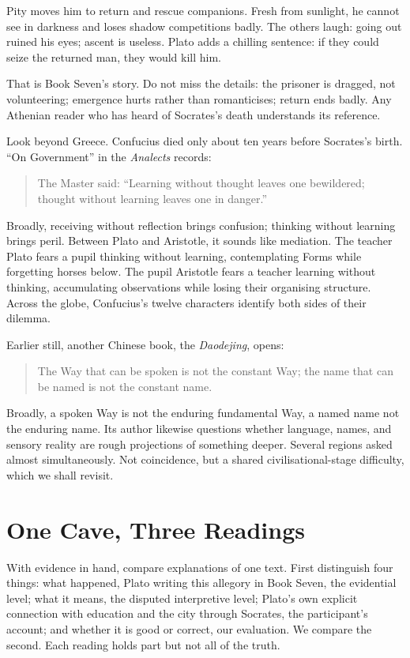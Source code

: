 Pity moves him to return and rescue companions. Fresh from sunlight, he cannot see in darkness and loses shadow competitions badly. The others laugh: going out ruined his eyes; ascent is useless. Plato adds a chilling sentence: if they could seize the returned man, they would kill him.

That is Book Seven's story. Do not miss the details: the prisoner is dragged, not volunteering; emergence hurts rather than romanticises; return ends badly. Any Athenian reader who has heard of Socrates's death understands its reference.

Look beyond Greece. Confucius died only about ten years before Socrates's birth. ``On Government'' in the \textit{Analects} records:

\begin{quote}
The Master said: ``Learning without thought leaves one bewildered; thought without learning leaves one in danger.''
\end{quote}
Broadly, receiving without reflection brings confusion; thinking without learning brings peril. Between Plato and Aristotle, it sounds like mediation. The teacher Plato fears a pupil thinking without learning, contemplating Forms while forgetting horses below. The pupil Aristotle fears a teacher learning without thinking, accumulating observations while losing their organising structure. Across the globe, Confucius's twelve characters identify both sides of their dilemma.

Earlier still, another Chinese book, the \textit{Daodejing}, opens:

\begin{quote}
The Way that can be spoken is not the constant Way; the name that can be named is not the constant name.
\end{quote}
Broadly, a spoken Way is not the enduring fundamental Way, a named name not the enduring name. Its author likewise questions whether language, names, and sensory reality are rough projections of something deeper. Several regions asked almost simultaneously. Not coincidence, but a shared civilisational-stage difficulty, which we shall revisit.

\section{One Cave, Three Readings}
With evidence in hand, compare explanations of one text. First distinguish four things: what happened, Plato writing this allegory in Book Seven, the evidential level; what it means, the disputed interpretive level; Plato's own explicit connection with education and the city through Socrates, the participant's account; and whether it is good or correct, our evaluation. We compare the second. Each reading holds part but not all of the truth.

